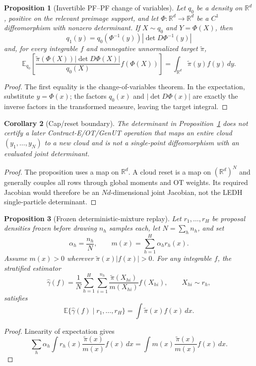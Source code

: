 \documentclass[11pt]{article}
\newtheorem{proposition}{Proposition}
\newtheorem{corollary}[proposition]{Corollary}
\newcommand{\R}{\mathbb{R}}
\newcommand{\abs}[1]{\left|#1\right|}
\begin{document}
\begin{proposition}[Invertible PF--PF change of variables]
\label{prop:ledh-pfpf-change}
Let $q_0$ be a density on $\R^d$, positive on the relevant preimage support,
and let $\Phi:\R^d\to\R^d$ be a $C^1$ diffeomorphism with nonzero determinant.
If $X\sim q_0$ and $Y=\Phi(X)$, then
\[
 q_1(y)=q_0(\Phi^{-1}(y))\abs{\det D\Phi^{-1}(y)}
\]
and, for every integrable $f$ and nonnegative unnormalized target
$\widetilde\pi$,
\[
 {\mathbb E}_{q_0}\!\left[
 \frac{\widetilde\pi(\Phi(X))\abs{\det D\Phi(X)}}{q_0(X)}
 f(\Phi(X))\right]
 =\int_{\R^d}\widetilde\pi(y)f(y)\,dy.
\]
\end{proposition}
\begin{proof}
The first equality is the change-of-variables theorem.  In the expectation,
substitute $y=\Phi(x)$; the factors $q_0(x)$ and
$\abs{\det D\Phi(x)}$ are exactly the inverse factors in the transformed
measure, leaving the target integral.
\end{proof}

\begin{corollary}[Cap/reset boundary]
\label{cor:ledh-reset-boundary}
The determinant in Proposition~\ref{prop:ledh-pfpf-change} does not certify a
later Contract-E/OT/GenUT operation that maps an entire cloud
$(y_1,\ldots,y_N)$ to a new cloud and is not a single-point diffeomorphism with
an evaluated joint determinant.
\end{corollary}
\begin{proof}
The proposition uses a map on $\R^d$.  A cloud reset is a map on
$(\R^d)^N$ and generally couples all rows through global moments and OT
weights.  Its required Jacobian would therefore be an $Nd$-dimensional joint
Jacobian, not the LEDH single-particle determinant.
\end{proof}

\begin{proposition}[Frozen deterministic-mixture replay]
\label{prop:ledh-replay-unbiased}
Let $r_1,\ldots,r_H$ be proposal densities frozen before drawing
$n_h$ samples each, let $N=\sum_h n_h$, and set
\[
 \alpha_h=\frac{n_h}{N},\qquad m(x)=\sum_{h=1}^H\alpha_h r_h(x).
\]
Assume $m(x)>0$ wherever $\widetilde\pi(x)|f(x)|>0$.  For any integrable
$f$, the stratified estimator
\[
 \widehat\gamma(f)
 =\frac1N\sum_{h=1}^H\sum_{i=1}^{n_h}
 \frac{\widetilde\pi(X_{hi})}{m(X_{hi})}f(X_{hi}),
 \qquad X_{hi}\sim r_h,
\]
satisfies
\[
 {\mathbb E}\{\widehat\gamma(f)\mid r_1,\ldots,r_H\}
 =\int\widetilde\pi(x)f(x)\,dx.
\]
\end{proposition}
\begin{proof}
Linearity of expectation gives
\[
 \sum_h\alpha_h\int r_h(x)
 \frac{\widetilde\pi(x)}{m(x)}f(x)\,dx
 =\int m(x)\frac{\widetilde\pi(x)}{m(x)}f(x)\,dx.
\]
\end{proof}
\end{document}
